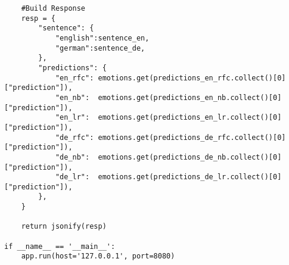 \begin{verbatim}
    #Build Response
    resp = {
        "sentence": {
            "english":sentence_en,
            "german":sentence_de,
        },
        "predictions": {
            "en_rfc": emotions.get(predictions_en_rfc.collect()[0]["prediction"]),
            "en_nb":  emotions.get(predictions_en_nb.collect()[0]["prediction"]),
            "en_lr":  emotions.get(predictions_en_lr.collect()[0]["prediction"]),
            "de_rfc": emotions.get(predictions_de_rfc.collect()[0]["prediction"]),
            "de_nb":  emotions.get(predictions_de_nb.collect()[0]["prediction"]),
            "de_lr":  emotions.get(predictions_de_lr.collect()[0]["prediction"]),
        },
    }
    
    return jsonify(resp)

if __name__ == '__main__':
    app.run(host='127.0.0.1', port=8080)
\end{verbatim}
\clearpage
